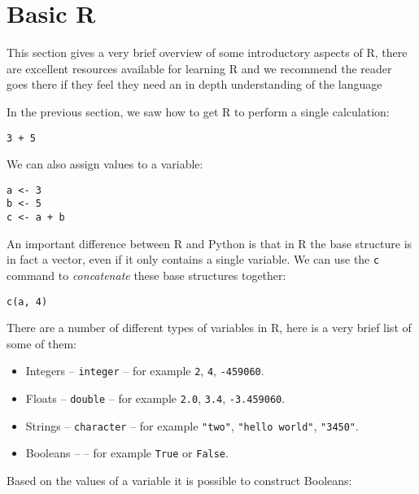 \section{Basic R}\label{sec:basic-R}

This section gives a very brief overview of some introductory aspects of R,
there are excellent resources available for learning R and we recommend the
reader goes there if they feel they need an in depth understanding of the
language %

In the previous section, we saw how to get R to perform a single
calculation:

\begin{verbatim}
3 + 5
\end{verbatim}

We can also assign values to a variable:

\begin{verbatim}
a <- 3
b <- 5
c <- a + b
\end{verbatim}

An important difference between R and Python is that in R the base structure is
in fact a vector, even if it only contains a single variable. We can use the
\texttt{c} command to \textit{concatenate} these base structures
together:

\begin{verbatim}
c(a, 4)
\end{verbatim}

There are a number of different types of variables in R, here is a very
brief list of some of them:

\begin{itemize}
    \item Integers -- \texttt{integer} -- for example \texttt{2},
        \texttt{4}, \texttt{-459060}.
    \item Floats -- \texttt{double} -- for example \texttt{2.0},
        \texttt{3.4}, \texttt{-3.459060}.
    \item Strings -- \texttt{character} -- for example
        \texttt{"two"}, \texttt{"hello world"}, \texttt{"3450"}.
    \item Booleans --  -- for example \texttt{True} or
        \texttt{False}.
\end{itemize}

Based on the values of a variable it is possible to construct Booleans:

